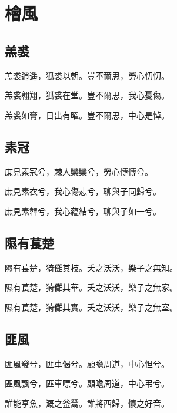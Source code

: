 \section[檜風]{檜風}

\subsection[羔裘]{羔裘}

羔裘逍遥，狐裘以朝。豈不爾思，勞心忉忉。

羔裘翱翔，狐裘在堂。豈不爾思，我心憂傷。

羔裘如膏，日出有曜。豈不爾思，中心是悼。

\subsection[素冠]{素冠}

庶見素冠兮，棘人欒欒兮，勞心慱慱兮。

庶見素衣兮，我心傷悲兮，聊與子同歸兮。

庶見素韠兮，我心藴結兮，聊與子如一兮。

\subsection[隰有萇楚]{隰有萇楚}

隰有萇楚，猗儺其枝。夭之沃沃，樂子之無知。

隰有萇楚，猗儺其華。夭之沃沃，樂子之無家。

隰有萇楚，猗儺其實。夭之沃沃，樂子之無室。

\subsection[匪風]{匪風}

匪風發兮，匪車偈兮。顧瞻周道，中心怛兮。

匪風飄兮，匪車嘌兮。顧瞻周道，中心弔兮。

誰能亨魚，溉之釜鬵。誰將西歸，懷之好音。
